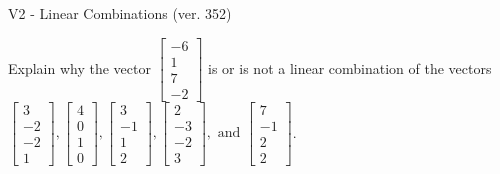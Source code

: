 \begin{exercise}
  \begin{exerciseTitle}V2 - Linear Combinations (ver. 352)\end{exerciseTitle}
  \begin{exerciseStatement}
    Explain why the vector \(\left[\begin{array}{c}
-6 \\
1 \\
7 \\
-2
\end{array}\right]\)  is or is not a linear 
	combination of the vectors \(\left[\begin{array}{c}
3 \\
-2 \\
-2 \\
1
\end{array}\right] , \left[\begin{array}{c}
4 \\
0 \\
1 \\
0
\end{array}\right] , \left[\begin{array}{c}
3 \\
-1 \\
1 \\
2
\end{array}\right] , \left[\begin{array}{c}
2 \\
-3 \\
-2 \\
3
\end{array}\right] , \text{ and } \left[\begin{array}{c}
7 \\
-1 \\
2 \\
2
\end{array}\right]\).
	



\end{exerciseStatement}
\end{exercise}
